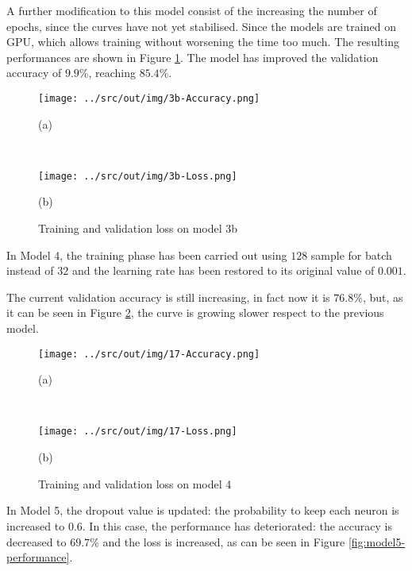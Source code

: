\documentclass[a4paper,12pt]{article} %
\begin{document}
	A further modification to this model consist of the increasing the number 
	of epochs, since the curves have not yet stabilised. Since the models are 
	trained on GPU, which allows training without worsening the time too much. 
	The resulting performances are shown in Figure 
	\ref{fig:model3b-performance}. The model has improved the validation 
	accuracy of $9.9\%$, reaching $85.4\%$.
	
	\begin{figure}[htb]
		\begin{minipage}[c]{.49\textwidth}
			\centering
			\texttt{[image: ../src/out/img/3b-Accuracy.png]}
			\caption*{(a)}
		\end{minipage}
		~
		\begin{minipage}[c]{.49\textwidth}
			\centering
			\texttt{[image: ../src/out/img/3b-Loss.png]}
			\caption*{(b)}
		\end{minipage}
		\caption{Training and validation loss on model 3b}
		\label{fig:model3b-performance}
	\end{figure}


	
	In Model 4, the training phase has been carried out using $128$ sample for 
	batch instead of $32$ and the learning rate has been restored to its 
	original value of $0.001$. 
	
	The current validation accuracy is still increasing, in fact now it is 
	$76.8\%$, but, as it can be seen in Figure \ref{fig:model4-performance}, 
	the curve is growing slower respect to the previous model.
	
	\begin{figure}[H]
		\begin{minipage}[c]{.49\textwidth}
			\centering
			\texttt{[image: ../src/out/img/17-Accuracy.png]}
			\caption*{(a)}
		\end{minipage}
		~
		\begin{minipage}[c]{.49\textwidth}
			\centering
			\texttt{[image: ../src/out/img/17-Loss.png]}
			\caption*{(b)}
		\end{minipage}
		\caption{Training and validation loss on model 4}
		\label{fig:model4-performance}
	\end{figure}
	
	In Model 5, the dropout value is updated: the probability to keep each 
	neuron is increased to $0.6$.
	In this case, the performance has deteriorated: the accuracy is decreased 
	to $69.7\%$ and the loss is increased, as can be seen in Figure 
	\ref*{fig:model5-performance}.
	
\end{document}
